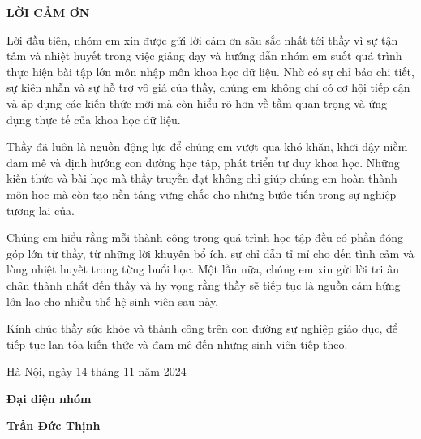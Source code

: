 
\thispagestyle{fancy}

\begin{center}
    \Large{\textbf{LỜI CẢM ƠN}}\\
\end{center}
\vspace{0.5cm}
\hspace{0.7cm} Lời đầu tiên, nhóm em xin được gửi lời cảm ơn sâu sắc nhất tới thầy vì sự tận tâm và nhiệt huyết trong việc giảng dạy và hướng dẫn nhóm em suốt quá trình thực hiện bài tập lớn môn nhập môn khoa học dữ liệu. Nhờ có sự chỉ bảo chi tiết, sự kiên nhẫn và sự hỗ trợ vô giá của thầy, chúng em không chỉ có cơ hội tiếp cận và áp dụng các kiến thức mới mà còn hiểu rõ hơn về tầm quan trọng và ứng dụng thực tế của khoa học dữ liệu.

\hspace{0.7cm} Thầy đã luôn là nguồn động lực để chúng em vượt qua khó khăn, khơi dậy niềm đam mê và định hướng con đường học tập, phát triển tư duy khoa học. Những kiến thức và bài học mà thầy truyền đạt không chỉ giúp chúng em hoàn thành môn học mà còn tạo nền tảng vững chắc cho những bước tiến trong sự nghiệp tương lai của.

\hspace{0.7cm} Chúng em hiểu rằng mỗi thành công trong quá trình học tập đều có phần đóng góp lớn từ thầy, từ những lời khuyên bổ ích, sự chỉ dẫn tỉ mỉ cho đến tình cảm và lòng nhiệt huyết trong từng buổi học. Một lần nữa, chúng em xin gửi lời tri ân chân thành nhất đến thầy và hy vọng rằng thầy sẽ tiếp tục là nguồn cảm hứng lớn lao cho nhiều thế hệ sinh viên sau này.

\hspace{0.7cm} Kính chúc thầy sức khỏe và thành công trên con đường sự nghiệp giáo dục, để tiếp tục lan tỏa kiến thức và đam mê đến những sinh viên tiếp theo.

\vspace{4cm}
\begin{flushright}
Hà Nội, ngày 14\hspace{0.05cm} tháng 11\hspace{0.05cm} năm 2024\hspace{0.05cm}

{\textbf{\large{Đại diện nhóm }}} \hspace{1.2cm} \textcolor{white}{.}

\vspace{1.5cm}

{\textbf{\large{Trần Đức Thịnh}}} \hspace{1.2cm} \textcolor{white}{.}
\end{flushright}


